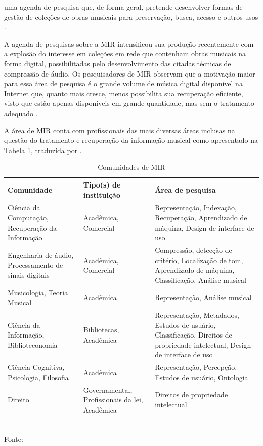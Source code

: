 \begin{citacao}
[...] uma agenda de pesquisa que, de forma geral, pretende desenvolver formas de gestão de coleções de obras musicais para preservação, busca, acesso e outros usos \cite{futrelle&downie2002}.
\end{citacao}

A agenda de pesquisas sobre a MIR intensificou sua produção recentemente com a explosão do interesse em coleções em rede que contenham obras musicais na forma digital, possibilitadas pelo desenvolvimento das citadas técnicas de compressão de áudio. Os pesquisadores de MIR observam que a motivação maior para essa área de pesquisa é o grande volume de música digital disponível na Internet que, quanto mais cresce, menos possibilita sua recuperação eficiente, visto que estão apenas disponíveis em grande quantidade, mas sem o tratamento adequado \cite{gomes2015}.

A área de MIR conta com profissionais das mais diversas áreas inclusas na questão do tratamento e recuperação da informação musical como apresentado na Tabela \ref{tab:comunidadeMIR}, traduzida por .

\begin{table}[ht!]
    \centering
    \caption{Comunidades de MIR}
    \begin{tabular}{p{4cm}|p{4.4cm}|p{4cm}}
    \hline
        \textbf{Comunidade} & \textbf{Tipo(s) de instituição} & \textbf{Área de pesquisa} \\
    \hline
        Ciência da Computação, Recuperação da Informação & Acadêmica, Comercial & Representação, Indexação, Recuperação, Aprendizado de máquina, Design de interface de uso \\
    \hline
        Engenharia de áudio, Processamento de sinais digitais & Acadêmica, Comercial & Compressão, detecção de critério, Localização de tom, Aprendizado de máquina, Classificação, Análise musical \\
    \hline
        Musicologia, Teoria Musical & Acadêmica & Representação, Análise musical \\
    \hline
        Ciência da Informação, Biblioteconomia & Bibliotecas, Acadêmica & Representação, Metadados, Estudos de usuário, Classificação, Direitos de propriedade intelectual, Design de interface de uso \\
    \hline
        Ciência Cognitiva, Psicologia, Filosofia & Acadêmica & Representação, Percepção, Estudos de usuário, Ontologia \\
    \hline
        Direito & Governamental, Profissionais da lei, Acadêmica & Direitos de propriedade intelectual \\
    \hline
    \end{tabular}
    \label{tab:comunidadeMIR}
    \\Fonte: 
\end{table}

